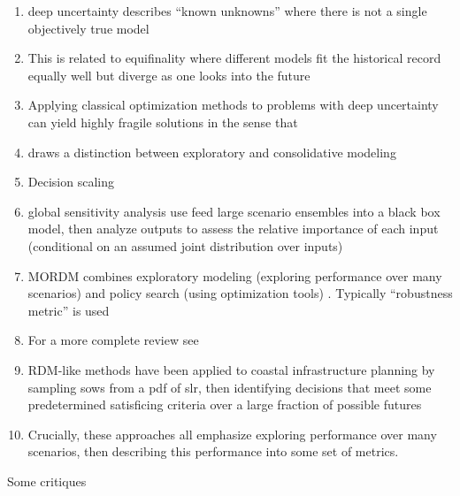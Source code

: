 \documentclass[12pt]{article}
\begin{document}
\begin{enumerate}
    \item deep uncertainty describes ``known unknowns'' where there is not a single objectively true model \citep{walker_deep:2013,Walker:2013gi,lempert_complex:2002}
    \item This is related to equifinality where different models fit the historical record equally well but diverge as one looks into the future \citep{beven_equifinality:2006,DossGollin:2019}
    \item Applying classical optimization methods to problems with deep uncertainty can yield highly fragile solutions in the sense that
    \item \citet{bankes:1993} draws a distinction between exploratory and consolidative modeling
    \item Decision scaling \citep{Steinschneider:2015kk}
    \item global sensitivity analysis \citep{saltelli_sensitivity:2010,herman_salib:2017,sobol_sensitivity:2001} use feed large scenario ensembles into a black box model, then analyze outputs to assess the relative importance of each input (conditional on an assumed joint distribution over inputs)
    \item MORDM \citep{kasprzyk:2013} combines exploratory modeling (exploring performance over many scenarios) and policy search (using optimization tools)  \citep{kasprzyk:2013,kasprzyk_denovo:2012,hadka_mordm:2015}. Typically ``robustness metric'' is used \citep{herman:2015,mcphail_robustness:2019}
    \item For a more complete review see \citet{marchau:2019}
    \item RDM-like methods have been applied to coastal infrastructure planning by sampling \glspl{sow} from a \gls{pdf} of \gls{slr}, then identifying decisions that meet some predetermined satisficing criteria \citep{mcphail_robustness:2019} over a large fraction of possible futures \citep{sriver_sealevel:2018,garner_slrise:2018,lempert_slr:2012}
    \item Crucially, these approaches all emphasize exploring performance over many scenarios, then describing this performance into some set of metrics.
\end{enumerate}
Some critiques
\end{document}

